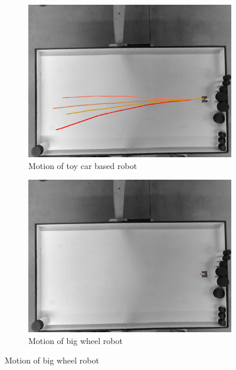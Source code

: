 \begin{figure}
	\centering
	\begin{subfigure}[t]{0.47\textwidth}
		\includegraphics[width=\textwidth]{../hardwareX_paper/robot_17.png}
		\caption{Motion of toy car based robot}
	\end{subfigure}
	\begin{subfigure}[t]{0.47\textwidth}
		\includegraphics[width=\textwidth]{../hardwareX_paper/robot_1.png}
		\caption{Motion of big wheel robot}
	\end{subfigure}
	

\end{figure}

